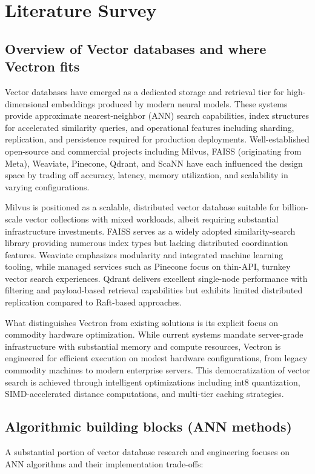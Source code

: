 \chapter{Literature Survey}

\section{Overview of Vector databases and where Vectron fits}
Vector databases have emerged as a dedicated storage and retrieval tier for high-dimensional embeddings produced by modern neural models. These systems provide approximate nearest-neighbor (ANN) search capabilities, index structures for accelerated similarity queries, and operational features including sharding, replication, and persistence required for production deployments. Well-established open-source and commercial projects including Milvus, FAISS (originating from Meta), Weaviate, Pinecone, Qdrant, and ScaNN have each influenced the design space by trading off accuracy, latency, memory utilization, and scalability in varying configurations. 

Milvus is positioned as a scalable, distributed vector database suitable for billion-scale vector collections with mixed workloads, albeit requiring substantial infrastructure investments. FAISS serves as a widely adopted similarity-search library providing numerous index types but lacking distributed coordination features. Weaviate emphasizes modularity and integrated machine learning tooling, while managed services such as Pinecone focus on thin-API, turnkey vector search experiences. Qdrant delivers excellent single-node performance with filtering and payload-based retrieval capabilities but exhibits limited distributed replication compared to Raft-based approaches.

What distinguishes Vectron from existing solutions is its explicit focus on commodity hardware optimization. While current systems mandate server-grade infrastructure with substantial memory and compute resources, Vectron is engineered for efficient execution on modest hardware configurations, from legacy commodity machines to modern enterprise servers. This democratization of vector search is achieved through intelligent optimizations including int8 quantization, SIMD-accelerated distance computations, and multi-tier caching strategies.

\section{Algorithmic building blocks (ANN methods)}
A substantial portion of vector database research and engineering focuses on ANN algorithms and their implementation trade-offs:

